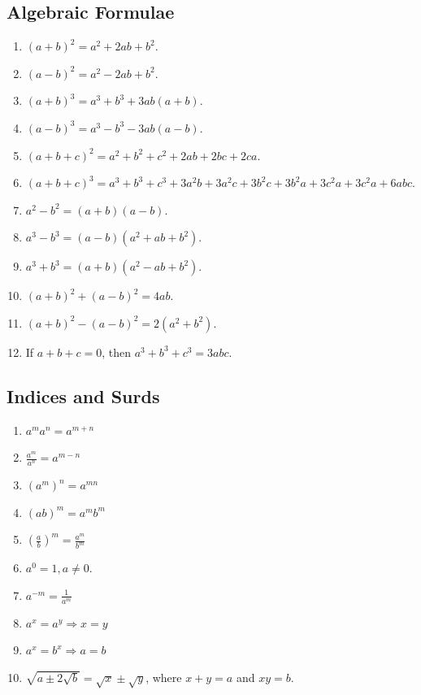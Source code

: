 \documentclass{article}
\begin{document}
\subsection*{Algebraic Formulae}
\begin{enumerate}
\item $(a+b)^{2}=a^{2}+2ab+b^{2}.$
\item $(a-b)^{2}=a^{2}-2ab+b^{2}.$
\item $(a+b)^{3}=a^{3}+b^{3}+3ab(a+b).$
\item $(a-b)^{3}=a^{3}-b^{3}-3ab(a-b).$
\item $(a+b+c)^{2}=a^{2}+b^{2}+c^{2}+2ab+2bc+2ca.$
\item $(a+b+c)^{3}=a^{3}+b^{3}+c^{3}+3a^{2}b+3a^{2}c+3b^{2}c+3b^{2}a+3c^{2}a+3c^{2}a+6abc.$
\item $a^{2}-b^{2}=(a+b)(a-b).$
\item $a^{3}-b^{3}=(a-b)(a^{2}+ab+b^{2}).$
\item $a^{3}+b^{3}=(a+b)(a^{2}-ab+b^{2}).$
\item $(a+b)^{2}+(a-b)^{2}=4ab.$
\item $(a+b)^{2}-(a-b)^{2}=2(a^{2}+b^{2}).$
\item If $a+b+c=0$, then $a^{3}+b^{3}+c^{3}=3abc.$
\end{enumerate}

\subsection*{Indices and Surds}
\begin{enumerate}
\item $a^{m}a^{n}=a^{m+n}$
\item $\frac{a^{m}}{a^{n}}=a^{m-n}$
\item $(a^{m})^{n}=a^{mn}$
\item $(ab)^{m}=a^{m}b^{m}$
\item $(\frac{a}{b})^{m}=\frac{a^{m}}{b^{m}}$
\item $a^{0}=1, a\ne 0.$
\item $a^{-m}=\frac{1}{a^{m}}$
\item $a^{x}=a^{y}\Rightarrow x=y$
\item $a^{x}=b^{x}\Rightarrow a=b$
\item $\sqrt{a\pm2\sqrt{b}}=\sqrt{x}\pm\sqrt{y}$, where $x+y=a$ and $xy=b$.
\end{enumerate}
\end{document}
